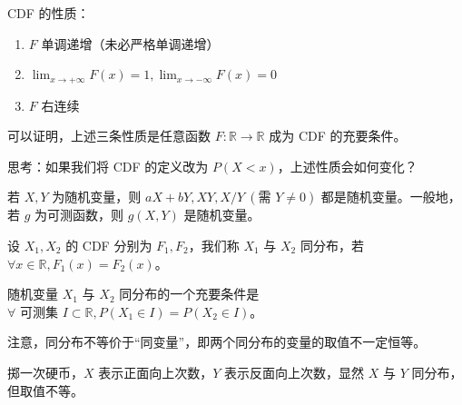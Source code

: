 \documentclass[../main.tex]{subfiles}
\begin{document}
\begin{proposition}
  CDF 的性质：
  \begin{enumerate}
    \item $F$ 单调递增（未必严格单调递增）
    \item $\lim_{x\rightarrow+\infty}F(x)=1,\lim_{x\rightarrow-\infty}F(x)=0$
    \item $F$ 右连续
  \end{enumerate}
\end{proposition}

可以证明，上述三条性质是任意函数 $F:\mathbb{R}\rightarrow\mathbb{R}$ 成为 CDF 的充要条件。

思考：如果我们将 CDF 的定义改为 $P(X<x)$，上述性质会如何变化？

\begin{proposition}
  若 $X,Y$ 为随机变量，则 $aX+bY,XY,X/Y\ (\text{需 }Y\neq 0)$ 都是随机变量。一般地，若 $g$ 为可测函数，则 $g(X,Y)$ 是随机变量。
\end{proposition}

\begin{definition}\label{def:2.1.4}
  设 $X_1,X_2$ 的 CDF 分别为 $F_1,F_2$，我们称 $X_1$ 与 $X_2$ 同分布，若 $\forall x\in\mathbb{R},F_1(x)=F_2(x)$。
\end{definition}

\begin{proposition}
  随机变量 $X_1$ 与 $X_2$ 同分布的一个充要条件是 $\forall \text{ 可测集 }I\subset\mathbb{R},P(X_1\in I)=P(X_2\in I)$。
\end{proposition}

注意，同分布不等价于“同变量”，即两个同分布的变量的取值不一定恒等。

\begin{example}
  掷一次硬币，$X$ 表示正面向上次数，$Y$ 表示反面向上次数，显然 $X$ 与 $Y$ 同分布，但取值不等。
\end{example}
\end{document}
